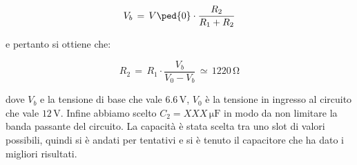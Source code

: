 \begin{equation}
        V_b\,=\,V\ped{0}\cdot\frac{R_2}{R_1+R_2}
\end{equation}

e pertanto si ottiene che:

\begin{equation}
        R_2\,=\,R_1\cdot\frac{V_b}{V_0-V_b} \,\simeq\, 1220\,\si{\ohm}
\end{equation}

dove $V_b$ e la tensione di base che vale $6.6\,\si{\volt}$, $V_0$ è la tensione in ingresso al circuito che vale $12\,\si{\volt}$.
Infine abbiamo scelto $C_2=XXX\,\si{\micro\farad}$ in modo da non limitare la banda passante del circuito. La capacità è stata scelta tra uno slot di valori possibili, quindi si è andati per tentativi e si è tenuto il capacitore che ha dato i migliori risultati.











